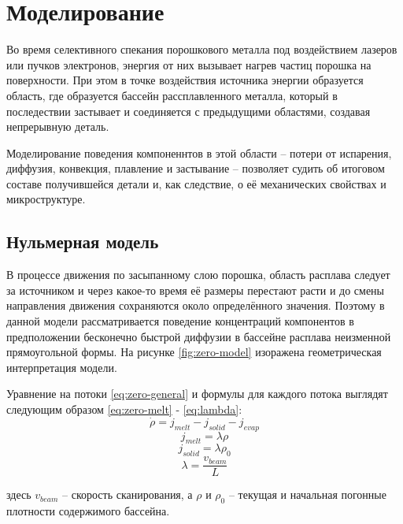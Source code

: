 \section{Моделирование}

Во время селективного спекания порошкового металла под воздействием лазеров или пучков электронов, энергия от них вызывает нагрев частиц порошка на поверхности. 
При этом в точке воздействия источника энергии образуется область, где образуется бассейн рассплавленного металла, который в последествии застывает и соединяется с предыдущими областями, создавая непрерывную деталь.

Моделирование поведения компоненнтов в этой области -- потери от испарения, диффузия, конвекция, плавление и застывание -- позволяет судить об итоговом составе получившейся детали и, как следствие, о её механических свойствах и микроструктуре.

\subsection{Нульмерная модель}

В процессе движения по засыпанному слою порошка, область расплава следует за источником и через какое-то время её размеры перестают расти и до смены направления движения сохраняются около определённого значения. 
Поэтому в данной модели рассматривается поведение концентраций компонентов в предположении бесконечно быстрой диффузии в бассейне расплава неизменной 
прямоугольной формы. На рисунке \ref{fig:zero-model} изоражена геометрическая интерпретация модели.

Уравнение на потоки \ref{eq:zero-general} и формулы для каждого потока выглядят следующим образом \ref{eq:zero-melt} - \ref{eq:lambda}:
\begin{equation}
    \label{eq:zero-general}
    \dot{\rho} = j_{melt} - j_{solid} - j_{evap}
\end{equation}
\begin{equation}
    \label{eq:zero-melt}
    j_{melt} = \lambda \rho
\end{equation}
\begin{equation}
    \label{eq:zer-sol}
    j_{solid} = \lambda \rho_0
\end{equation}
\begin{equation}
    \label{eq:lambda}
    \lambda = \frac{v_{beam}}{L}
\end{equation}

\noindent
здесь $v_{beam}$ -- скорость сканирования, а $\rho$ и $\rho_0$ -- текущая и начальная погонные плотности содержимого бассейна.


